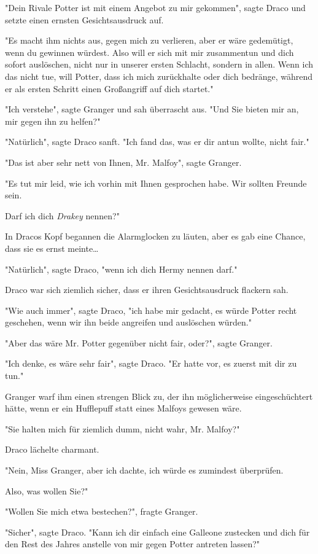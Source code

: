 {"Dein Rivale Potter ist mit einem Angebot zu mir gekommen", sagte Draco und setzte einen ernsten Gesichtsausdruck auf.

"Es macht ihm nichts aus, gegen mich zu verlieren, aber er wäre gedemütigt, wenn du gewinnen würdest. Also will er sich mit mir zusammentun und dich sofort auslöschen, nicht nur in unserer ersten Schlacht, sondern in allen. Wenn ich das nicht tue, will Potter, dass ich mich zurückhalte oder dich bedränge, während er als ersten Schritt einen Großangriff auf dich startet."

"Ich verstehe", sagte Granger und sah überrascht aus. "Und Sie bieten mir an, mir gegen ihn zu helfen?"

"Natürlich", sagte Draco sanft. "Ich fand das, was er dir antun wollte, nicht fair."

"Das ist aber sehr nett von Ihnen, Mr. Malfoy", sagte Granger.

"Es tut mir leid, wie ich vorhin mit Ihnen gesprochen habe. Wir sollten Freunde sein.

Darf ich dich \emph{Drakey} nennen?"

In Dracos Kopf begannen die Alarmglocken zu läuten, aber es gab eine Chance, dass sie es ernst meinte…

"Natürlich", sagte Draco, "wenn ich dich Hermy nennen darf."

Draco war sich ziemlich sicher, dass er ihren Gesichtsausdruck flackern sah.

"Wie auch immer", sagte Draco, "ich habe mir gedacht, es würde Potter recht geschehen, wenn wir ihn beide angreifen und auslöschen würden."

"Aber das wäre Mr. Potter gegenüber nicht fair, oder?", sagte Granger.

"Ich denke, es wäre sehr fair", sagte Draco. "Er hatte vor, es zuerst mit dir zu tun."

Granger warf ihm einen strengen Blick zu, der ihn möglicherweise eingeschüchtert hätte, wenn er ein Hufflepuff statt eines Malfoys gewesen wäre.

"Sie halten mich für ziemlich dumm, nicht wahr, Mr. Malfoy?"

Draco lächelte charmant.

"Nein, Miss Granger, aber ich dachte, ich würde es zumindest überprüfen.

Also, was wollen Sie?"

"Wollen Sie mich etwa bestechen?", fragte Granger.

"Sicher", sagte Draco. "Kann ich dir einfach eine Galleone zustecken und dich für den Rest des Jahres anstelle von mir gegen Potter antreten lassen?"

}
